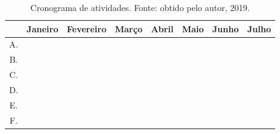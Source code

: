 \documentclass[12pt]{article}
\begin{document}
\begin{table}[h!]
\centering
\scalebox{0.7} {

\begin{tabular}{| c | c | c | c | c | c | c | c |} 
 \hline
       & Janeiro & Fevereiro & Março & Abril & Maio & Junho & Julho \\ [0.5ex] 
 \hline
 A. & \cellcolor{black} &   \cellcolor{black}  & & & & & \\
 \hline
 B. & \cellcolor{black}  & \cellcolor{black} & \cellcolor{black} & \cellcolor{black}  & \cellcolor{black} & & \\
 \hline
 C. &   &  &  & \cellcolor{black} & \cellcolor{black} & & \\
 \hline
 D. &   &   &  &  & \cellcolor{black} & \cellcolor{black} & \\
 \hline
 E. &  & &  \cellcolor{black}&  \cellcolor{black} &  \cellcolor{black} & \cellcolor{black} & \\ 
 \hline
 F. & & & & & & \cellcolor{black} &  \cellcolor{black} \\
 \hline 
\end{tabular}
}
\caption{Cronograma de atividades. Fonte: obtido pelo autor, 2019.}
\label{table:cronograma}
\end{table}



\end{document}
